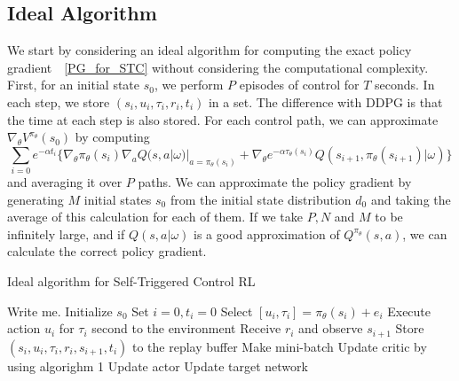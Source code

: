 \documentclass[english, dvipdfmx]{ampmt}             %
\begin{document}
\subsection{Ideal Algorithm}
We start by considering an ideal algorithm for computing the exact policy gradient　\eqref{PG_for_STC} without considering the computational complexity. First, for an initial state $s_0$, we perform $P$ episodes of control for $T$ seconds.  In each step, we store $(s_i, u_i, \tau_i, r_i, t_i)$ in a set. The difference with DDPG is that the time at each step is also stored. For each control path, we can approximate $\nabla_{\theta}V^{\pi_{\theta}}(s_0)$ by computing 
\begin{equation}
	\sum_{i=0} e^{-\alpha t_i}\{\nabla_{\theta}\pi_{\theta}(s_i)\nabla_{a}Q(s,a|\omega)|_{a=\pi_{\theta}(s_i)} + \nabla_{\theta}e^{-\alpha\tau_{\theta}(s_{i})}Q(s_{i+1},\pi_{\theta}(s_{i+1})|\omega)\}
\end{equation}
and averaging it over $P$ paths. We can approximate the policy gradient by generating $M$ initial states $s_0$ from the initial state distribution $d_0$ and taking the average of this calculation for each of them. If we take $P, N$ and $M$ to be infinitely large, and if $Q(s,a|\omega)$ is a good approximation of $Q^{\pi_{\theta}}(s,a)$, we can calculate the correct policy gradient.

\begin{algorithm}                      
\caption{Ideal algorithm for Self-Triggered Control RL}         
\label{alg2}                          
\begin{algorithmic}                  
    \STATE Write me.
    	\STATE Initialize $s_0$
    	\STATE Set $i = 0, t_i = 0$
    		\STATE Select $[u_i, \tau_i] = \pi_{\theta}(s_i) + e_i$
		\STATE Execute action $u_i$ for $\tau_i$ second to the environment
		\STATE Receive $r_i$ and observe $s_{i+1}$
		\STATE Store $(s_i, u_i, \tau_i, r_i, s_{i+1}, t_i)$ to the replay buffer
		\STATE Make mini-batch
		\STATE Update critic by using algorighm 1
		\STATE Update actor
		\STATE Update target network
    	\ENDWHILE
    \ENDFOR
    \fi
\end{algorithmic}
\end{algorithm}
\end{document}
